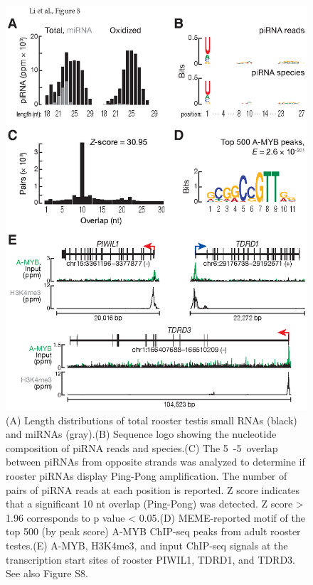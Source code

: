     \begin{figure} %
      \centering 
      \includegraphics{Figures/MolCel/MolCel2013_Fig8.eps}
      \caption[Feed-Forward Regulation of piRNA Biogenesis by A-MYB is Conserved in Rooster]
      {
      	(A) Length distributions of total rooster testis small RNAs (black) and miRNAs (gray).(B) Sequence logo showing the nucleotide composition of piRNA reads and species.(C) The 5\textprime~-5\textprime~overlap between piRNAs from opposite strands was analyzed to determine if rooster piRNAs display Ping-Pong amplification. The number of pairs of piRNA reads at each position is reported. Z score indicates that a significant 10 nt overlap (Ping-Pong) was detected. Z score > 1.96 corresponds to p value < 0.05.(D) MEME-reported motif of the top 500 (by peak score) A-MYB ChIP-seq peaks from adult rooster testes.(E) A-MYB, H3K4me3, and input ChIP-seq signals at the transcription start sites of rooster PIWIL1, TDRD1, and TDRD3. See also Figure S8.
      	}
      \label{MolCel:fig:MolCelF8}
    	\end{figure}
